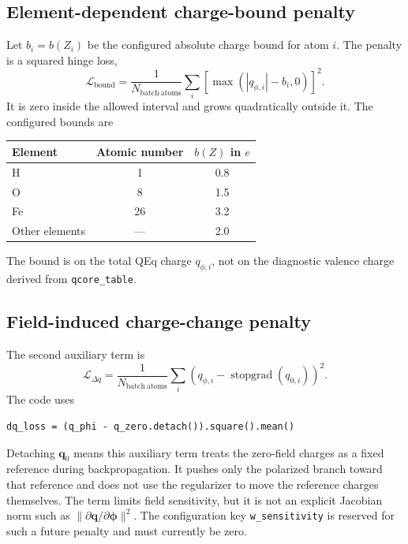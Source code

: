 \documentclass[11pt,a4paper]{article}
\newcommand{\vect}[1]{\bm{#1}}
\begin{document}
\subsection{Element-dependent charge-bound penalty}

Let $b_i=b(Z_i)$ be the configured absolute charge bound for atom $i$.  The
penalty is a squared hinge loss,
\begin{equation}
  \mathcal L_{\mathrm{bound}}
  =\frac{1}{N_{\mathrm{batch\ atoms}}}
   \sum_i\left[\max\left(|q_{\phi,i}|-b_i,0\right)\right]^2.
  \label{eq:bound-loss}
\end{equation}
It is zero inside the allowed interval and grows quadratically outside it.  The
configured bounds are
\begin{center}
\begin{tabular}{@{}lcc@{}}
\toprule
Element & Atomic number & $b(Z)$ in $e$\\
\midrule
H  & 1  & 0.8\\
O  & 8  & 1.5\\
Fe & 26 & 3.2\\
Other elements & --- & 2.0\\
\bottomrule
\end{tabular}
\end{center}
The bound is on the total QEq charge $q_{\phi,i}$, not on the diagnostic valence
charge derived from \texttt{qcore\_table}.

\subsection{Field-induced charge-change penalty}

The second auxiliary term is
\begin{equation}
  \mathcal L_{\Delta q}
  =\frac{1}{N_{\mathrm{batch\ atoms}}}
   \sum_i(q_{\phi,i}-\operatorname{stopgrad}(q_{0,i}))^2.
  \label{eq:dq-loss}
\end{equation}
The code uses
\begin{lstlisting}[style=pythonstyle]
dq_loss = (q_phi - q_zero.detach()).square().mean()
\end{lstlisting}
Detaching $\vect q_0$ means this auxiliary term treats the zero-field charges as
a fixed reference during backpropagation.  It pushes only the polarized branch
toward that reference and does not use the regularizer to move the reference
charges themselves.  The term limits field sensitivity, but it is not an
explicit Jacobian norm such as $\lVert\partial\vect q/\partial\vect\phi\rVert^2$.
The configuration key \texttt{w\_sensitivity} is reserved for such a future
penalty and must currently be zero.
\end{document}
